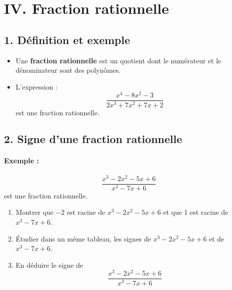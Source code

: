 \documentclass[12pt,a4paper]{article}
\newcounter{exemple}
\begin{document}
\section*{IV. Fraction rationnelle}

\subsection*{1. Définition et exemple}

\begin{itemize}
    \item Une \textbf{fraction rationnelle} est un quotient dont le numérateur et le dénominateur sont des polynômes.
    \item L'expression :
    \[
    \frac{x^4 - 8x^2 - 3}{2x^3 + 7x^2 + 7x + 2}
    \]
    est une fraction rationnelle.
\end{itemize}

\subsection*{2. Signe d'une fraction rationnelle}

\paragraph{Exemple :}
\[
\frac{x^3 - 2x^2 - 5x + 6}{x^3 - 7x + 6}
\]
est une fraction rationnelle.

\begin{enumerate}
    \item Montrer que \(-2\) est racine de \( x^3 - 2x^2 - 5x + 6 \) et que 1 est racine de \( x^3 - 7x + 6 \).
    \item Étudier dans un même tableau, les signes de \( x^3 - 2x^2 - 5x + 6 \) et de \( x^3 - 7x + 6 \).
    \item En déduire le signe de
    \[
    \frac{x^3 - 2x^2 - 5x + 6}{x^3 - 7x + 6}
    \]
\end{enumerate}
\end{document}
